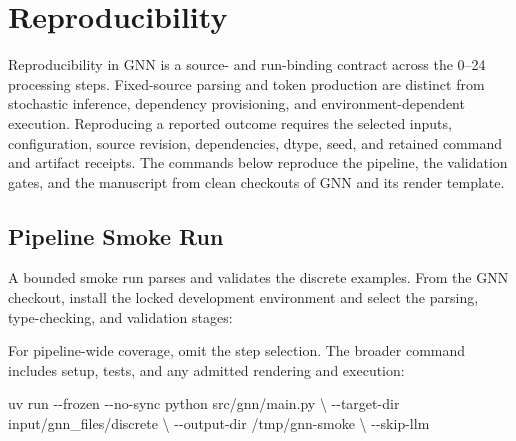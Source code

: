 \documentclass[
  english,
  9pt,
]{extarticle}
\newenvironment{Shaded}{}{}
\newcommand{\AttributeTok}[1]{\textcolor[rgb]{0.49,0.56,0.16}{#1}}
\newcommand{\DataTypeTok}[1]{\textcolor[rgb]{0.56,0.13,0.00}{#1}}
\newcommand{\ExtensionTok}[1]{#1}
\newcommand{\FunctionTok}[1]{\textcolor[rgb]{0.02,0.16,0.49}{#1}}
\newcommand{\NormalTok}[1]{#1}
\newcommand{\StringTok}[1]{\textcolor[rgb]{0.25,0.44,0.63}{#1}}
\newcommand{\VariableTok}[1]{\textcolor[rgb]{0.10,0.09,0.49}{#1}}
\begin{document}
\newpage

\section{Reproducibility}\label{sec:reproducibility}

Reproducibility in GNN is a source- and run-binding contract across the
0--24 processing steps. Fixed-source parsing and token production are
distinct from stochastic inference, dependency provisioning, and
environment-dependent execution. Reproducing a reported outcome requires
the selected inputs, configuration, source revision, dependencies,
dtype, seed, and retained command and artifact receipts. The commands
below reproduce the pipeline, the validation gates, and the manuscript
from clean checkouts of GNN and its render template.

\subsection{Pipeline Smoke Run}\label{pipeline-smoke-run}

A bounded smoke run parses and validates the discrete examples. From the
GNN checkout, install the locked development environment and select the
parsing, type-checking, and validation stages:

\begin{Shaded}
\end{Shaded}

For pipeline-wide coverage, omit the step selection. The broader command
includes setup, tests, and any admitted rendering and execution:

\begin{Shaded}
\begin{Highlighting}[]
\ExtensionTok{uv}\NormalTok{ run }\AttributeTok{{-}{-}frozen} \AttributeTok{{-}{-}no{-}sync}\NormalTok{ python src/gnn/main.py }\DataTypeTok{\textbackslash{}}
  \AttributeTok{{-}{-}target{-}dir}\NormalTok{ input/gnn\_files/discrete }\DataTypeTok{\textbackslash{}}
  \AttributeTok{{-}{-}output{-}dir}\NormalTok{ /tmp/gnn{-}smoke }\DataTypeTok{\textbackslash{}}
  \AttributeTok{{-}{-}skip{-}llm}
\end{Highlighting}
\end{Shaded}
\end{document}
